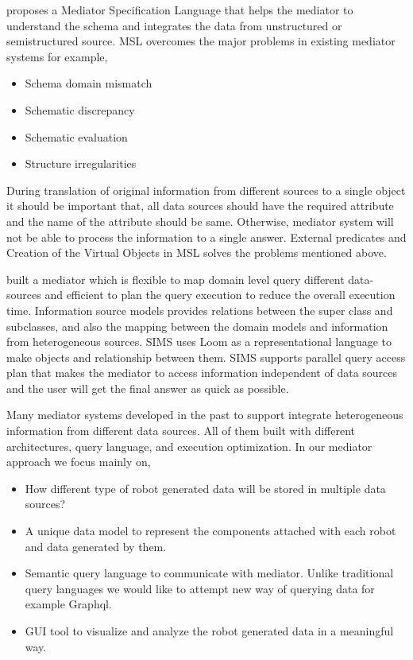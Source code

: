 \documentclass[12pt]{article}
\begin{document}
\citet{papakonstantinou1996medmaker} proposes a Mediator Specification Language that helps the mediator to understand the schema and integrates the data from unstructured or semistructured source. MSL overcomes the major problems in existing mediator systems for example,
\begin{itemize}
	\item Schema domain mismatch 
	\item Schematic discrepancy
	\item Schematic evaluation
	\item Structure irregularities
\end{itemize}

During translation of original information from different sources to a single object it should be important that, all data sources should have the required attribute and the name of the attribute should be same. Otherwise, mediator system will not be able to process the information to a single answer.  External predicates and Creation of the Virtual Objects in MSL solves the problems mentioned above.

\citet{arens1996query} built a mediator which is flexible to map domain level query different data-sources and efficient to plan the query execution to reduce the overall execution time. Information source models provides relations between the super class and subclasses, and also the mapping between the domain models and information from heterogeneous sources. SIMS uses Loom as a representational language to make objects and relationship between them. SIMS supports parallel query access plan that makes the mediator to access information independent of data sources and the user will get the final answer as quick as possible.

Many mediator systems developed in the past to support integrate heterogeneous information from different data sources. All of them built with different architectures, query language, and execution optimization. In our mediator approach we focus mainly on,
\begin{itemize}
	\item How different type of robot generated data will be stored in multiple data sources?
	\item A unique data model to represent the components attached with each robot and data generated by them.
	\item Semantic query language to communicate with mediator. Unlike traditional query languages we would like to attempt new way of querying data for example Graphql.
	\item GUI tool to visualize and analyze the robot generated data in a meaningful way.
\end{itemize} 
\end{document}
